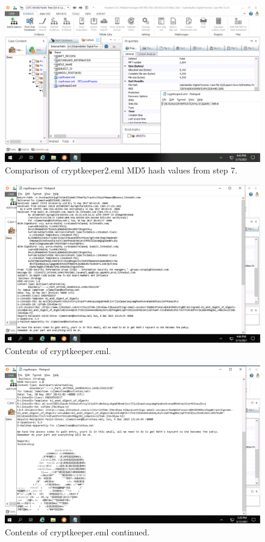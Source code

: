 \begin{figure}[H]
    \centering
    \includegraphics[width=\linewidth]{figures/2-13.png}
    \caption{Comparison of cryptkeeper2.eml MD5 hash values from step 7.}
\end{figure}

\begin{figure}[H]
    \centering
    \includegraphics[width=\linewidth]{figures/2-14.png}
    \caption{Contents of cryptkeeper.eml.}
\end{figure}

\begin{figure}[H]
    \centering
    \includegraphics[width=\linewidth]{figures/2-15.png}
    \caption{Contents of cryptkeeper.eml continued.}
\end{figure}

